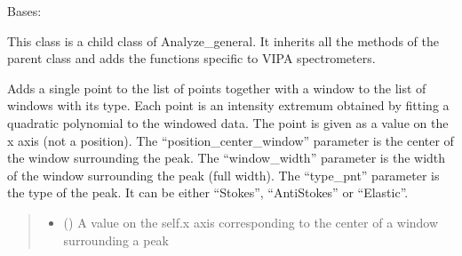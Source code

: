 \documentclass[letterpaper,10pt,english]{sphinxmanual}
\begin{document}

\begin{fulllineitems}
\label{\detokenize{source/HDF5_BLS:HDF5_BLS.analyze.Analyze_VIPA}}
\pysigstartsignatures
\pysiglinewithargsret
{}
{\sphinxparamcomma {}}
{}
\pysigstopsignatures
\sphinxAtStartPar
Bases: {\hyperref[\detokenize{source/HDF5_BLS:HDF5_BLS.analyze.Analyze_general}]{}}

\sphinxAtStartPar
This class is a child class of Analyze\_general. It inherits all the methods of the parent class and adds the functions specific to VIPA spectrometers.

\begin{fulllineitems}
\label{\detokenize{source/HDF5_BLS:HDF5_BLS.analyze.Analyze_VIPA.add_point}}
\pysigstartsignatures
\pysiglinewithargsret
{}
{\sphinxparamcomma {}\sphinxparamcomma {}}
{}
\pysigstopsignatures
\sphinxAtStartPar
Adds a single point to the list of points together with a window to the list of windows with its type. Each point is an intensity extremum obtained by fitting a quadratic polynomial to the windowed data.
The point is given as a value on the x axis (not a position).
The “position\_center\_window” parameter is the center of the window surrounding the peak. The “window\_width” parameter is the width of the window surrounding the peak (full width). The “type\_pnt” parameter is the type of the peak. It can be either “Stokes”, “Anti\sphinxhyphen{}Stokes” or “Elastic”.
\begin{quote}\begin{description}
\begin{itemize}
\item {} 
\sphinxAtStartPar
{} () \textendash{} A value on the self.x axis corresponding to the center of a window surrounding a peak


\end{itemize}
\end{description}
\end{quote}
\end{fulllineitems}
\end{fulllineitems}
\end{document}
